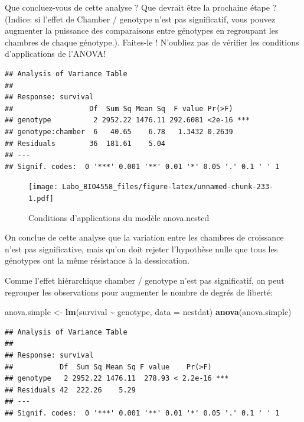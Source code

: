 \documentclass[
  12pt,
]{book}
\newenvironment{Shaded}{\begin{snugshade}}{\end{snugshade}}
\newcommand{\DataTypeTok}[1]{\textcolor[rgb]{0.13,0.29,0.53}{#1}}
\newcommand{\KeywordTok}[1]{\textcolor[rgb]{0.13,0.29,0.53}{\textbf{#1}}}
\newcommand{\NormalTok}[1]{#1}
\newcommand{\OperatorTok}[1]{\textcolor[rgb]{0.81,0.36,0.00}{\textbf{#1}}}
\newcommand{\StringTok}[1]{\textcolor[rgb]{0.31,0.60,0.02}{#1}}
\begin{document}
Que concluez-vous de cette analyse ? Que devrait être la prochaine étape ? (Indice: si l'effet de Chamber / genotype n'est pas significatif, vous pouvez augmenter la puissance des comparaisons entre génotypes en regroupant les chambres de chaque génotype.). Faites-le ! N'oubliez pas de vérifier les conditions d'applications de l'ANOVA!

\begin{verbatim}
## Analysis of Variance Table
## 
## Response: survival
##                  Df  Sum Sq Mean Sq  F value Pr(>F)    
## genotype          2 2952.22 1476.11 292.6081 <2e-16 ***
## genotype:chamber  6   40.65    6.78   1.3432 0.2639    
## Residuals        36  181.61    5.04                    
## ---
## Signif. codes:  0 '***' 0.001 '**' 0.01 '*' 0.05 '.' 0.1 ' ' 1
\end{verbatim}

\begin{figure}
\centering
\texttt{[image: Labo\_BIO4558\_files/figure-latex/unnamed-chunk-233-1.pdf]}
\caption{\label{fig:unnamed-chunk-233}Conditions d'applications du modèle anova.nested}
\end{figure}

On conclue de cette analyse que la variation entre les chambres de croissance n'est pas significative, mais qu'on doit rejeter l'hypothèse nulle que tous les génotypes ont la même résistance à la dessiccation.

Comme l'effet hiérarchique chamber / genotype n'est pas significatif, on peut regrouper les observations pour augmenter le nombre de degrés de liberté:

\begin{Shaded}
\begin{Highlighting}[]
\NormalTok{anova.simple \textless{}{-}}\StringTok{ }\KeywordTok{lm}\NormalTok{(survival }\OperatorTok{\textasciitilde{}}\StringTok{ }\NormalTok{genotype, }\DataTypeTok{data =}\NormalTok{ nestdat)}
\KeywordTok{anova}\NormalTok{(anova.simple)}
\end{Highlighting}
\end{Shaded}

\begin{verbatim}
## Analysis of Variance Table
## 
## Response: survival
##           Df  Sum Sq Mean Sq F value    Pr(>F)    
## genotype   2 2952.22 1476.11  278.93 < 2.2e-16 ***
## Residuals 42  222.26    5.29                      
## ---
## Signif. codes:  0 '***' 0.001 '**' 0.01 '*' 0.05 '.' 0.1 ' ' 1
\end{verbatim}
\end{document}

